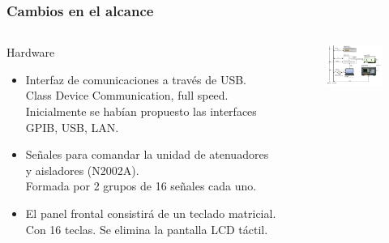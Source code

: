 \documentclass[xcolor=pdftext, table]{beamer}
\begin{document}
	\begin{frame}
		\frametitle{Cambios en el alcance}
		
		\begin{columns}
			\begin{column}{6cm}
				\begin{block}{Hardware}		
					\small	
					\begin{itemize}				
						\item Interfaz de comunicaciones a través de USB. \\ 
						{\tiny Class Device Communication, full speed.}
						{\tiny Inicialmente se habían propuesto las interfaces GPIB, USB, LAN.}
		
						\item Señales para comandar la unidad de atenuadores y aisladores (N2002A). \\ 
						{\tiny Formada por 2 grupos de 16 señales cada uno.}
								
						\item El panel frontal consistirá de un teclado matricial. \\ 
						{\tiny Con 16 teclas.} 
						{\tiny Se elimina la pantalla LCD táctil.}
					\end{itemize}
				\end{block}	
			\end{column}
			
			\begin{column}{6cm}
				\begin{figure}
					\begin{center}
						\includegraphics[width=6cm]{Imagenes/DiagramaBloquesSistema.pdf}
					\end{center}
				\end{figure}
			\end{column}			
		\end{columns}
		
	\end{frame}
	
	
\end{document}
